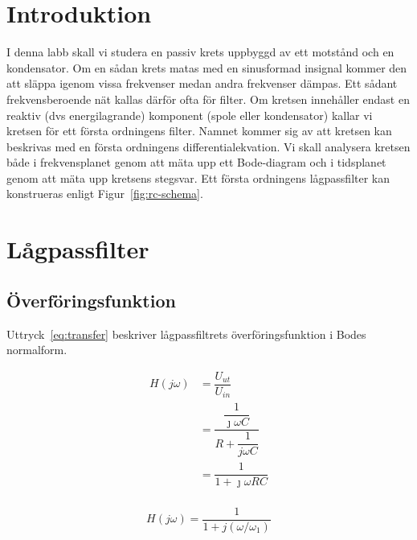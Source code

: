 %
%

\section{Introduktion}\label{intro}
I denna labb skall vi studera en passiv krets uppbyggd av ett motstånd och en
kondensator. Om en sådan krets matas med en sinusformad insignal kommer den att
släppa igenom vissa frekvenser medan andra frekvenser dämpas. Ett sådant
frekvensberoende nät kallas därför ofta för filter. Om kretsen innehåller
endast en reaktiv (dvs energilagrande) komponent (spole eller kondensator)
kallar vi kretsen för ett första ordningens filter. Namnet kommer sig av att
kretsen kan beskrivas med en första ordningens differentialekvation.  Vi skall
analysera kretsen både i frekvensplanet genom att mäta upp ett Bode-diagram och
i tidsplanet genom att mäta upp kretsens stegsvar.  Ett första ordningens
lågpassfilter kan konstrueras enligt Figur~\ref{fig:rc-schema}.

\section{Lågpassfilter}
\subsection{Överföringsfunktion}
Uttryck~\eqref{eq:transfer} beskriver lågpassfiltrets överföringsfunktion i
Bodes normalform.

\begin{equation*}
  \begin{split}
    H(j\omega) &= \dfrac{U_{ut}}{U_{in}}                                      \\
               &= \dfrac{\dfrac{1}{\jmath\omega C}}{R + \dfrac{1}{j\omega C}} \\
               &= \dfrac{1}{1+\jmath\omega R C}                               \\
  \end{split}
\end{equation*}

\begin{equation}\label{eq:transfer}
  H(j\omega) = \dfrac{1}{1+j(\omega/\omega_1)}
\end{equation}

